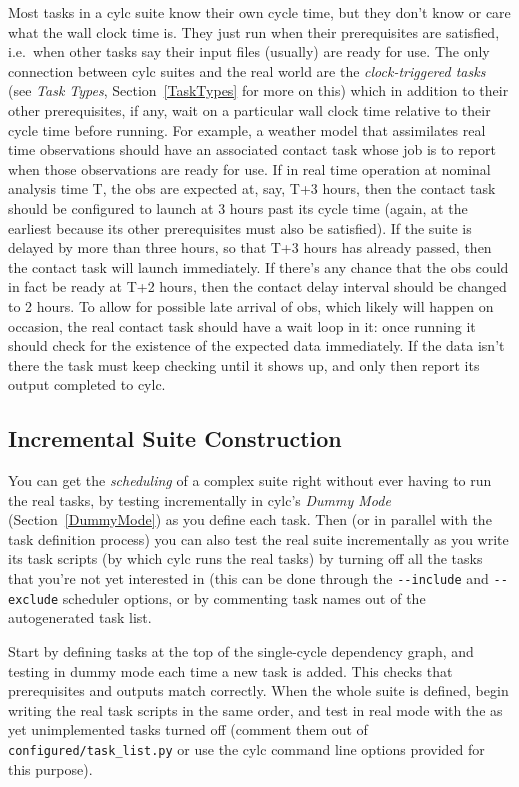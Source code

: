 \documentclass[11pt,a4paper]{article}
\begin{document}
Most tasks in a cylc suite know their own cycle time, but they don't
know or care what the wall clock time is.  They just run when their
prerequisites are satisfied, i.e.\  when other tasks say their input
files (usually) are ready for use. The only connection between cylc
suites and the real world are the {\em clock-triggered tasks} (see {\em
Task Types}, Section~\ref{TaskTypes} for more on this) which in addition to
their other prerequisites, if any, wait on a particular wall clock time
relative to their cycle time before running.  For example, a weather
model that assimilates real time observations should have an associated
contact task whose job is to report when those observations are ready
for use.  If in real time operation at nominal analysis time T, the obs
are expected at, say, T+3 hours, then the contact task should be
configured to launch at 3 hours past its cycle time (again, at the
earliest because its other prerequisites must also be satisfied).
If the suite is delayed by more than three hours, so that T+3 hours 
has already passed, then the contact task will launch immediately.
If there's any chance that the obs could in fact be ready at T+2 hours,
then the contact delay interval should be changed to 2 hours.  To allow
for possible late arrival of obs, which likely will happen on occasion,
the real contact task should have a wait loop in it: once running it
should check for the existence of the expected data immediately. If the
data isn't there the task must keep checking until it shows up, and only then
report its output completed to cylc. 

\subsection{Incremental Suite Construction} 
\label{IncrementalSuiteConstruction}

You can get the {\em scheduling} of a complex suite right without ever
having to run the real tasks, by testing incrementally in cylc's {\em
Dummy Mode} (Section~\ref{DummyMode}) as you define each task. Then (or
in parallel with the task definition process) you can also test the real
suite incrementally as you write its task scripts (by which cylc runs
the real tasks) by turning off all the tasks that you're not yet
interested in (this can be done through the \lstinline=--include= and
\lstinline=--exclude= scheduler options, or by commenting task names out
of the autogenerated task list.

Start by defining tasks at the top of the single-cycle dependency graph,
and testing in dummy mode each time a new task is added. This checks
that prerequisites and outputs match correctly. When the whole suite is
defined, begin writing the real task scripts in the same order, and test
in real mode with the as yet unimplemented tasks turned off (comment
them out of \lstinline=configured/task_list.py= or use the cylc
command line options provided for this purpose). 
\end{document}
